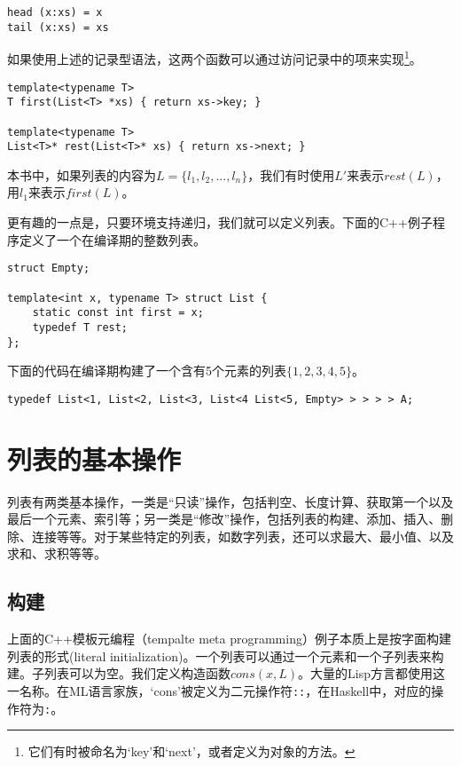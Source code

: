 \documentclass[UTF8]{article}
\begin{document}
\lstset{language=Haskell}
\begin{lstlisting}[style=Haskell]
head (x:xs) = x
tail (x:xs) = xs
\end{lstlisting}

如果使用上述的记录型语法，这两个函数可以通过访问记录中的项来实现\footnote{它们有时被命名为‘key’和‘next’，或者定义为对象的方法。}。

\lstset{language=C++}
\begin{lstlisting}
template<typename T>
T first(List<T> *xs) { return xs->key; }

template<typename T>
List<T>* rest(List<T>* xs) { return xs->next; }
\end{lstlisting}

本书中，如果列表的内容为$L = \{ l_1, l_2, ..., l_n\}$，我们有时使用$L'$来表示$rest(L)$，用$l_1$来表示$first(L)$。

更有趣的一点是，只要环境支持递归，我们就可以定义列表。下面的C++例子程序定义了一个在编译期的整数列表。

\lstset{language=C++}
\begin{lstlisting}
struct Empty;

template<int x, typename T> struct List {
    static const int first = x;
    typedef T rest;
};
\end{lstlisting}

下面的代码在编译期构建了一个含有5个元素的列表$\{1, 2, 3, 4, 5\}$。

\begin{lstlisting}
typedef List<1, List<2, List<3, List<4 List<5, Empty> > > > > A;
\end{lstlisting}

\section{列表的基本操作}

列表有两类基本操作，一类是“只读”操作，包括判空、长度计算、获取第一个以及最后一个元素、索引等；另一类是“修改”操作，包括列表的构建、添加、插入、删除、连接等等。对于某些特定的列表，如数字列表，还可以求最大、最小值、以及求和、求积等等。

\subsection{构建}

上面的C++模板元编程（tempalte meta programming）例子本质上是按字面构建列表的形式(literal initialization)。一个列表可以通过一个元素和一个子列表来构建。子列表可以为空。我们定义构造函数$cons(x, L)$。大量的Lisp方言都使用这一名称。在ML语言家族，‘cons’被定义为二元操作符\texttt{::}，在Haskell中，对应的操作符为\texttt{:}。
\end{document}
